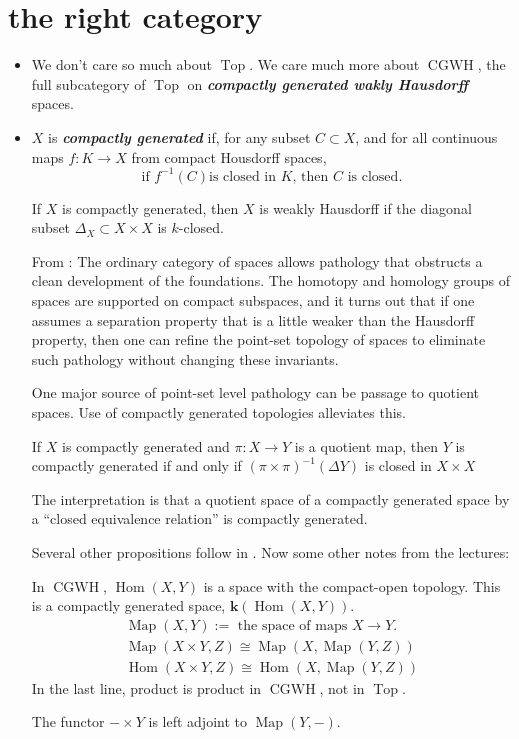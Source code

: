 \documentclass{article}
\numberwithin{equation}{section}
\DeclareMathOperator{\Top}{Top}
\DeclareMathOperator{\CGWH}{CGWH}
\DeclareMathOperator{\Hom}{Hom}
\DeclareMathOperator{\Map}{Map}
\begin{document}
\section{the right category}
\begin{itemize}
	\item We don't care so much about $\Top$. We care much more about $\CGWH$, the full subcategory of $\Top$ on \textbf{\textit{compactly generated wakly Hausdorff}} spaces.
	\item $X$ is \textbf{\textit{compactly generated}} if, for any subset $C\subset X$, and for all continuous maps $f:K\to X$ from compact Housdorff spaces, \[\text{if } f^{-1}(C) \text{is closed in }K\text{, then } C\text{ is closed}.\]
	\begin{claim}
		If $X$ is compactly generated, then $X$ is weakly Hausdorff if the diagonal subset $\Delta_X\subset X\times X$ is {\color{orange}$k$-closed}.
	\end{claim}
	From \cite{may}: The ordinary category of spaces allows pathology that obstructs a clean development of the foundations. The homotopy and homology groups of spaces are supported on compact subspaces, and it turns out that if one assumes a separation property that is a little weaker than the Hausdorff property, then one can refine the point-set topology of spaces to eliminate such pathology without changing these invariants.
	
	One major source of point-set level pathology can be passage to quotient spaces. Use of compactly generated topologies alleviates this.
	\begin{prop}
		If $X$ is compactly generated and $\pi:X\to Y$ is a quotient map, then $Y$ is compactly generated if and only if $(\pi\times \pi)^{-1}(\Delta Y)$ is closed in $X\times X$
	\end{prop}
	The interpretation is that a quotient space of a compactly generated space by a “closed equivalence relation” is compactly generated.
	
	{\color{cyan}Several other propositions follow in \cite{may}. Now some other notes from the lectures:}
	
	In $\CGWH$, $\Hom(X,Y)$ is a space with the compact-open topology. {\color{orange} This is a compactly generated space, $\mathbf{k}(\Hom(X,Y))$}. 
	\begin{align*}
		\Map(X,Y):=\text{ the space of maps }X\to Y.\\
		\Map(X\times Y,Z)\cong\Map(X,\Map(Y,Z))\\
		\Hom(X\times Y,Z)\cong \Hom(X,\Map(Y,Z))
	\end{align*}
	In the last line, product is product in $\CGWH$, not in $\Top$.
	
	The functor $-\times Y$ is left adjoint to $\Map(Y,-)$.
\end{itemize}
\end{document}
